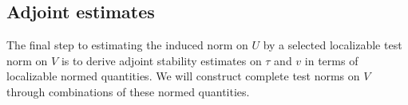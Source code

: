 \documentclass[11pt,onecolumn]{scrartcl}
\begin{document}

\subsection{Adjoint estimates}
\label{sec:strategy3}

The final step to estimating the induced norm on $U$ by a selected localizable test norm on $V$ is to derive adjoint stability estimates on $\tau$ and $v$ in terms of localizable normed quantities.  We will construct complete test norms on $V$ through combinations of these normed quantities.%
\end{document}
